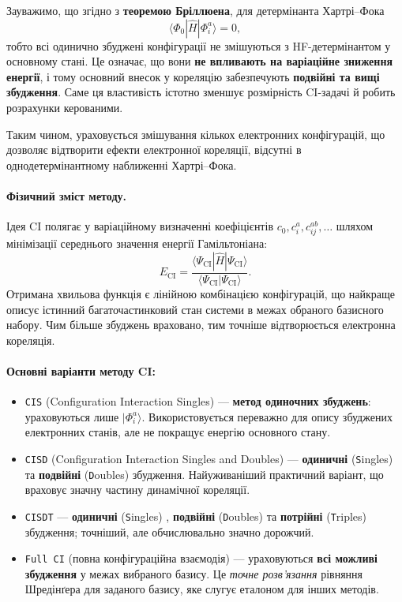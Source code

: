 \begin{commentbox}
Зауважимо, що згідно з \textbf{теоремою Бріллюена}, для детермінанта Хартрі–Фока
\[
    \langle \Phi_0 | \hat{H} | \Phi_i^a \rangle = 0,
\]
тобто всі одинично збуджені конфігурації не змішуються з HF-детермінантом у
основному стані. Це означає, що вони \textbf{не впливають на варіаційне зниження
енергії}, і тому основний внесок у кореляцію забезпечують
\textbf{подвійні та вищі збудження}. Саме ця властивість істотно зменшує
розмірність CI-задачі й робить розрахунки керованими.
\end{commentbox}


Таким чином, ураховується змішування кількох електронних конфігурацій, що дозволяє відтворити ефекти електронної кореляції, відсутні в однодетермінантному наближенні Хартрі–Фока.

\paragraph{Фізичний зміст методу.}
Ідея CI полягає у варіаційному визначенні коефіцієнтів $c_0, c_i^a, c_{ij}^{ab}, \ldots$ шляхом мінімізації середнього значення енергії Гамільтоніана:
\[
E_{\text{CI}} = \frac{\langle \Psi_{\text{CI}} | \hat{H} | \Psi_{\text{CI}} \rangle}{\langle \Psi_{\text{CI}} | \Psi_{\text{CI}} \rangle}.
\]
Отримана хвильова функція є лінійною комбінацією конфігурацій, що найкраще описує істинний багаточастинковий стан системи в межах обраного базисного набору. Чим більше збуджень враховано, тим точніше відтворюється електронна кореляція.

\paragraph{Основні варіанти методу CI:}
\begin{itemize}
    \item \texttt{CIS} (Configuration Interaction Singles) --- \textbf{метод одиночних збуджень}: ураховуються лише $|\Phi_i^a\rangle$. Використовується переважно для опису збуджених електронних станів, але не покращує енергію основного стану.
    \item \texttt{CISD} (Configuration Interaction Singles and Doubles) --- \textbf{одиничні} (\texttt{S}ingles) та \textbf{подвійні} (\texttt{D}oubles) збудження. Найуживаніший практичний варіант, що враховує значну частину динамічної кореляції.
    \item \texttt{CISDT} --- \textbf{одиничні} (\texttt{S}ingles) , \textbf{подвійні} (\texttt{D}oubles) та \textbf{потрійні} (\texttt{T}riples) збудження; точніший, але обчислювально значно дорожчий.
    \item \texttt{Full CI} (повна конфігураційна взаємодія) --- ураховуються \textbf{всі можливі збудження} у межах вибраного базису. Це \emph{точне розв’язання} рівняння Шредінґера для заданого базису, яке слугує еталоном для інших методів.
\end{itemize}

